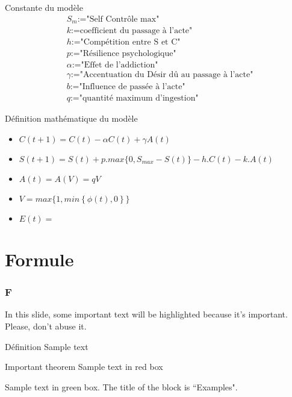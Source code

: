 \documentclass{beamer}
\begin{document}
\begin{frame}
	\begin{block}{Constante du modèle}
		\begin{align*}
			&S_m\text{:="Self Contrôle max"} \\
			&k\text{:=coefficient du passage à l'acte"} \\
			&h\text{:="Compétition entre S et C"} \\
			&p\text{:="Résilience psychologique"} \\
			&\alpha\text{:="Effet de l'addiction"} \\
			&\gamma \text{:="Accentuation du Désir dû au passage à l'acte"} \\
			&b\text{:="Influence de passée à l'acte"} \\
			&q\text{:="quantité maximum d'ingestion"}
		\end{align*}
	\end{block}
\end{frame}

	
\begin{frame}
	\begin{block}{Définition mathématique du modèle}
		\begin{itemize}
			\item<1-> $C(t+1) = C(t)- \alpha C(t) + \gamma A(t)$
			\item<2-> $S(t+1)=S(t)+p.max\{0,S_{max}-S(t)\}-h.C(t)-k.A(t)$
			\item<3-> $A(t)=A(V)=qV$
			\item<4->$V= max\{1,min\left\lbrace \phi(t),0 \right\rbrace \}$
			\item<5->$E(t)=$
		\end{itemize}
	\end{block}
\end{frame}

\section{Formule}

\begin{frame}
	\frametitle{F}
	
	In this slide, some important text will be
	\alert{highlighted} because it's important.
	Please, don't abuse it.
	
	\begin{block}{Définition}
		Sample text
	\end{block}
	
	\begin{alertblock}{Important theorem}
		Sample text in red box
	\end{alertblock}
	
	\begin{examples}
		Sample text in green box. The title of the block is ``Examples".
	\end{examples}
\end{frame}
\end{document}
